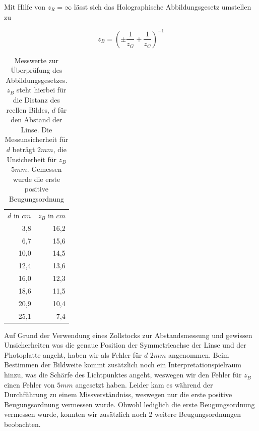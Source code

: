 \documentclass[bigchapter,colorback,accentcolor=tud4b,linedtoc,11pt]{tudreport}
\begin{document}
Mit Hilfe von $z_R = \infty$ lässt sich das Holographische Abbildungsgesetz
umstellen zu 

$$z_B = \left(\pm\frac{1}{z_G}+\frac{1}{z_C}\right)^{-1}$$

\begin{table}[H]
  \begin{center}
  \begin{tabular}{r|r}
    $d$ in $cm$ & $z_B$ in $cm$ \\ \hhline{=|=}
    3,8         & 16,2          \\ \hline
    6,7         & 15,6          \\ \hline
    10,0        & 14,5          \\ \hline
    12,4        & 13,6          \\ \hline
    16,0        & 12,3          \\ \hline
    18,6        & 11,5          \\ \hline
    20,9        & 10,4          \\ \hline
    25,1        & 7,4           \\
	\end{tabular}
    \caption{Messwerte zur Überprüfung des Abbildungsgesetzes. $z_B$ steht
      hierbei für die Distanz des reellen Bildes, $d$ für den Abstand der
      Linse. Die Messunsicherheit für $d$ beträgt $2mm$, die Unsicherheit für
      $z_B$ $5mm$. Gemessen wurde die erste positive Beugungsordnung}
  \end{center}
\end{table}

Auf Grund der Verwendung eines Zollstocks zur Abstandsmessung und gewissen
Unsicherheiten was die genaue Position der Symmetrieachse der Linse und der
Photoplatte angeht, haben wir als Fehler für $d$ $2 mm$ angenommen. Beim
Bestimmen der Bildweite kommt zusätzlich noch ein Interpretationspielraum
hinzu, was die Schärfe des Lichtpunktes angeht, weswegen wir den Fehler für
$z_B$ einen Fehler von $5mm$ angesetzt haben. Leider kam es während der
Durchführung zu einem Missverständniss, weswegen nur die erste positive
Beugungsordnung vermessen wurde. Obwohl lediglich die erste Beugungsordnung
vermessen wurde, konnten wir zusätzlich noch 2 weitere Beugungsordnungen
beobachten. 
\end{document}
